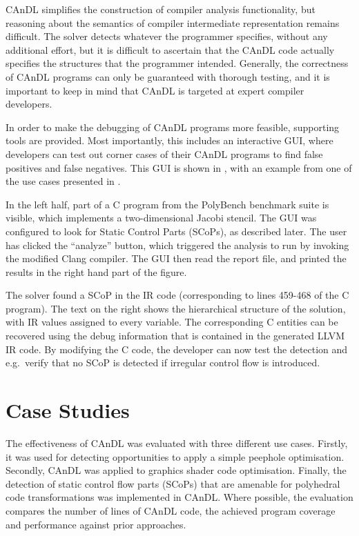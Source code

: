     CAnDL simplifies the construction of compiler analysis functionality, but
    reasoning about the semantics of compiler intermediate representation
    remains difficult.
    The solver detects whatever the programmer specifies, without any additional
    effort, but it is difficult to ascertain that the CAnDL code actually
    specifies the structures that the programmer intended.
    Generally, the correctness of CAnDL programs can only be guaranteed with
    thorough testing, and it is important to keep in mind that CAnDL is targeted
    at expert compiler developers.

    In order to make the debugging of CAnDL programs more feasible, 
    supporting tools are provided.
    Most importantly, this includes an interactive GUI, where developers can
    test out corner cases of their CAnDL programs to find false positives and
    false negatives.
    This GUI is shown in , with an example from one of the use
    cases presented in .

    In the left half, part of a C program from the PolyBench benchmark suite
    is visible, which implements a two-dimensional Jacobi stencil.
    The GUI was configured to look for Static Control Parts (SCoPs), as
    described later.
    The user has clicked the ``analyze'' button, which triggered the analysis to
    run by invoking the modified Clang compiler.
    The GUI then read the report file, and printed the results in the right
    hand part of the figure.

    The solver found a SCoP in the IR code (corresponding to lines 459-468 of
    the C program).
    The text on the right shows the hierarchical structure of the solution, with
    IR values assigned to every variable.
    The corresponding C entities can be recovered using the debug
    information that is contained in the generated LLVM IR code.
    By modifying the C code, the developer can now test the detection and
    e.g.\ verify that no SCoP is detected if irregular control flow is
    introduced.

\section{Case Studies}
\label{sec:casestudies}

    The effectiveness of CAnDL was evaluated with three different use cases.
    Firstly, it was used for detecting opportunities to apply a simple peephole
    optimisation.
    Secondly, CAnDL was applied to graphics shader code optimisation.
    Finally, the detection of static control flow parts (SCoPs) that are
    amenable for polyhedral code transformations was implemented in CAnDL.
    Where possible, the evaluation compares the number of lines of CAnDL code,
    the achieved program coverage and performance against prior approaches.

